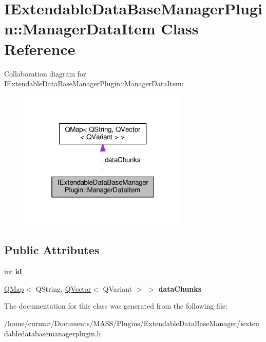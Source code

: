 \hypertarget{class_i_extendable_data_base_manager_plugin_1_1_manager_data_item}{}\section{I\+Extendable\+Data\+Base\+Manager\+Plugin\+:\+:Manager\+Data\+Item Class Reference}
\label{class_i_extendable_data_base_manager_plugin_1_1_manager_data_item}


Collaboration diagram for I\+Extendable\+Data\+Base\+Manager\+Plugin\+:\+:Manager\+Data\+Item\+:\nopagebreak
\begin{figure}[H]
\begin{center}
\leavevmode
\includegraphics[width=229pt]{class_i_extendable_data_base_manager_plugin_1_1_manager_data_item__coll__graph}
\end{center}
\end{figure}
\subsection*{Public Attributes}
\begin{DoxyCompactItemize}
\item 
int {\bfseries id}\hypertarget{class_i_extendable_data_base_manager_plugin_1_1_manager_data_item_abd5e8e3ceaa0d584593b9afc7bd4d4e3}{}\label{class_i_extendable_data_base_manager_plugin_1_1_manager_data_item_abd5e8e3ceaa0d584593b9afc7bd4d4e3}

\item 
\hyperlink{class_q_map}{Q\+Map}$<$ Q\+String, \hyperlink{class_q_vector}{Q\+Vector}$<$ Q\+Variant $>$ $>$ {\bfseries data\+Chunks}\hypertarget{class_i_extendable_data_base_manager_plugin_1_1_manager_data_item_a1dcb37adfd0b55f67ddf2b1ecfa7a081}{}\label{class_i_extendable_data_base_manager_plugin_1_1_manager_data_item_a1dcb37adfd0b55f67ddf2b1ecfa7a081}

\end{DoxyCompactItemize}


The documentation for this class was generated from the following file\+:\begin{DoxyCompactItemize}
\item 
/home/curunir/\+Documents/\+M\+A\+S\+S/\+Plugins/\+Extendable\+Data\+Base\+Manager/iextendabledatabasemanagerplugin.\+h\end{DoxyCompactItemize}
